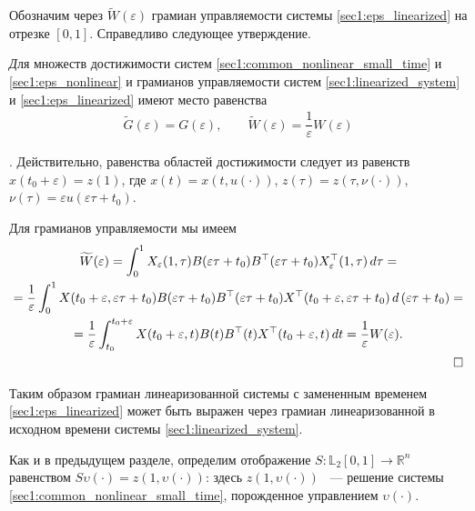 \documentclass[../main.tex]{subfiles}
\begin{document}
Обозначим через $ \widetilde{W}(\varepsilon) $ грамиан управляемости системы \eqref{sec1:eps_linearized} на отрезке $ [0,1] $.
Справедливо следующее утверждение.

\begin{utv}\label{sec1:utv:connection_with_scaled_system}
    {\textit Для множеств достижимости систем \eqref{sec1:common_nonlinear_small_time} и \eqref{sec1:eps_nonlinear} и грамианов управляемости систем \eqref{sec1:linearized_system} и \eqref{sec1:eps_linearized} имеют место равенства}
    \begin{gather*}
        \widetilde{G}(\varepsilon)=G(\varepsilon),  \qquad
        \widetilde{W}(\varepsilon) = \dfrac{1}{\varepsilon} W(\varepsilon)
    \end{gather*}
\end{utv}

\doc. 
Действительно, равенства областей достижимости следует из равенств $ x(t_0 + \varepsilon) = z(1) $, где $ x(t) = x(t,u(\cdot)) $, $ z(\tau) = z(\tau,\nu(\cdot))  $, $ \nu(\tau) = \varepsilon u(\varepsilon \tau + t_0)  $.

Для грамианов управляемости мы имеем
\begin{gather*}
\begin{gathered}
    \widetilde{W}(\varepsilon) =
        \int_0^1
        X_{ \varepsilon} (1,\tau)
        B(\varepsilon \tau + t_0)
        B^{\top}(\varepsilon \tau + t_0)
        X_{ \varepsilon}^{\top} (1,\tau) \, d\tau = \\
        = \dfrac{1}{\varepsilon}\int_0^1
        X(t_0+\varepsilon,\varepsilon \tau + t_0)
        B(\varepsilon \tau + t_0)
        B^{\top}(\varepsilon \tau + t_0)
        X^{\top}(t_0+\varepsilon,\varepsilon \tau + t_0) \,
        d\left( \varepsilon\tau + t_0\right) = \\ =
        \dfrac{1}{\varepsilon} \int_{t_0}^{t_0+\varepsilon}
        X(t_0+\varepsilon,t)
        B(t)
        B^{\top}(t)
        X^{\top}(t_0+\varepsilon,t) \, dt = \dfrac{1}{\varepsilon} W(\varepsilon). \\ \hfill \square
\end{gathered}
\end{gather*}

Таким образом грамиан линеаризованной системы с замененным временем \eqref{sec1:eps_linearized} может быть выражен через грамиан линеаризованной в исходном времени системы \eqref{sec1:linearized_system}.
        
Как и в предыдущем разделе, определим отображение $S: \mathbb{L}_2[0,1] \rightarrow \mathbb{R}^n $ равенством $S\upsilon(\cdot) = z(1,\upsilon(\cdot))$: здесь $ z(1,\upsilon(\cdot))$ ~--- решение системы \eqref{sec1:common_nonlinear_small_time}, порожденное управлением $\upsilon(\cdot)$. 
 
\end{document}

